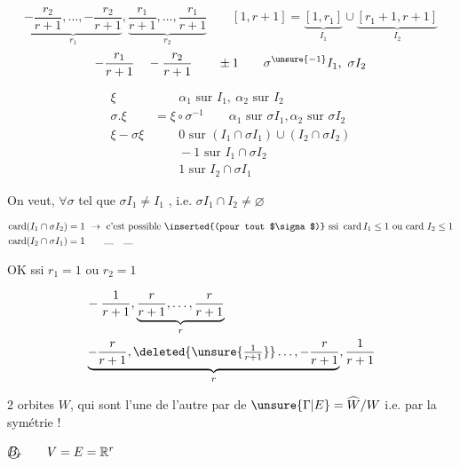
\[
\underbrace{-\frac{r_2}{r+1},\ldots,-\frac{r_2}{r+1}}_{r_1},
\underbrace{\frac{r_1}{r+1},\ldots,\frac{r_1}{r+1}}_{r_2}
\qquad
[1,r+1]=\underbrace{[1,r_1]}_{I_1}\cup\underbrace{[r_1+1,r+1]}_{I_2}
\]
\[-\frac{r_1}{r+1}\quad-\frac{r_2}{r+1}\qquad\pm1\qquad \sigma^{\unsure{-1}}I_1,\ \sigma I_2\]

\[
\begin{aligned}
\xi&\qquad\alpha_1\text{ sur }I_1,\ \alpha_2\text{ sur }I_2\\
\sigma.\xi&=\xi\circ\sigma^{-1}\qquad\alpha_1\text{ sur }\sigma I_1,\alpha_2\text{ sur }\sigma I_2\\
\xi-\sigma\xi&\qquad 0\text{ sur }(I_1\cap\sigma I_1)\cup(I_2\cap\sigma I_2)\\
&\qquad-1\text{ sur }I_1\cap\sigma I_2\\
&\qquad 1\text{ sur }I_2\cap\sigma I_1
\end{aligned}
\]

On veut, $\forall\sigma$ tel que $\sigma I_1\ne I_1$ ,   i.e. $\sigma I_1\cap I_2\ne\varnothing$


\[
\begin{aligned}
\operatorname{card}(I_1\cap\sigma I_2)&=1\ \to\ \text{c’est possible \inserted{(pour tout $\sigma$)} ssi }\operatorname{card}I_1\leq1\text{ ou card }I_2\leq1\\
\operatorname{card}(I_2\cap\sigma I_1)&=1\qquad\rule{1em}{.3pt}\quad\rule{1em}{.3pt}
\end{aligned}
\]

 OK ssi $r_1=1$ ou $r_2=1$

\[
\begin{aligned}
&-\frac1{r+1},\underbrace{\frac r{r+1},\ldots,\frac r{r+1}}_r\\
&\underbrace{-\frac r{r+1},\deleted{\unsure{\tfrac1{r+1}}}\ldots,-\frac r{r+1}}_r,\frac1{r+1}
\end{aligned}
\]

2 orbites   $W$, qui sont   l’une de l’autre par   de $\unsure{\Gamma|E}=\widehat W/W$ i.e. par la symétrie !

$\text{\textcircled{$B_r$}}\qquad V=E=\mathbb R^r$

